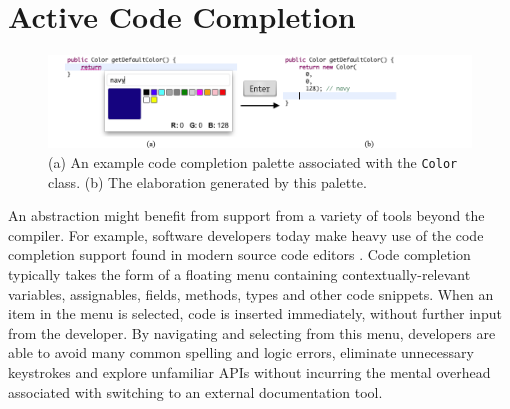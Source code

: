 \newpage
\section{Active Code Completion}\label{acc}
\begin{figure}[h]\label{color}
\begin{center}
\includegraphics[width=40pc]{color_palette.png}\end{center}
\caption{(a) An example code completion palette associated with the \texttt{Color} class. (b) The elaboration generated by this palette.}
\label{colorpalette}
\end{figure}


An abstraction might benefit from support from a variety of tools beyond the compiler. For example, software developers today make heavy use of the code completion support found in modern source code editors  \cite{murphy_how_2006}. Code completion typically takes the form of a floating menu containing  contextually-relevant variables, assignables, fields, methods, types and other code snippets. When an item in the menu is selected, code is inserted immediately, without further input from the developer.  By navigating and selecting from this menu, developers are able to avoid many common spelling and logic errors, eliminate unnecessary keystrokes and explore unfamiliar APIs without incurring the mental overhead associated with switching to an external documentation tool.

